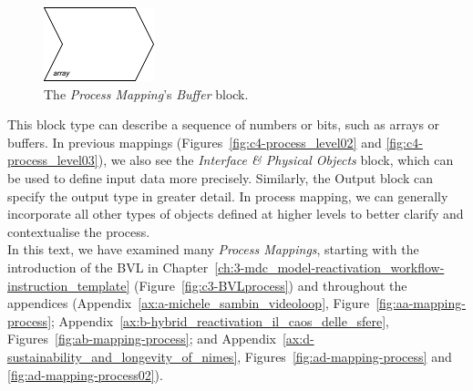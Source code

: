\begin{figure}[!h]
    \centering
    \includegraphics[width=0.2\linewidth]{chapters/4-MDC_model_application/image/bvl-bufferblock.png}
    \caption{The \textit{Process Mapping}'s \textit{Buffer} block.}
    \label{fig:c4-bvl-buffer}
\end{figure}
This block type can describe a sequence of numbers or bits, such as arrays or buffers. In previous mappings (Figures~\ref{fig:c4-process_level02} and \ref{fig:c4-process_level03}), we also see the \textit{Interface & Physical Objects} block, which can be used to define input data more precisely. Similarly, the Output block can specify the output type in greater detail.
In process mapping, we can generally incorporate all other types of objects defined at higher levels to better clarify and contextualise the process.\\
In this text, we have examined many \textit{Process Mappings}, starting with the introduction of the BVL in Chapter~\ref{ch:3-mdc_model-reactivation_workflow-instruction_template} (Figure~\ref{fig:c3-BVLprocess}) and throughout the appendices (Appendix~\ref{ax:a-michele_sambin_videoloop}, Figure~\ref{fig:aa-mapping-process}; Appendix~\ref{ax:b-hybrid_reactivation_il_caos_delle_sfere}, Figures~\ref{fig:ab-mapping-process}; and Appendix~\ref{ax:d-sustainability_and_longevity_of_nimes}, Figures~\ref{fig:ad-mapping-process} and \ref{fig:ad-mapping-process02}).

